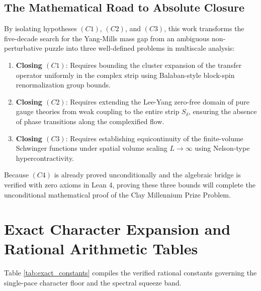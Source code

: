 \documentclass[11pt,reqno]{amsart}
\theoremstyle{plain}
\theoremstyle{definition}
\theoremstyle{remark}
\numberwithin{equation}{section}
\begin{document}
\subsection{The Mathematical Road to Absolute Closure}
By isolating hypotheses $(C1)$, $(C2)$, and $(C3)$, this work transforms the five-decade search for the Yang-Mills mass gap from an ambiguous non-perturbative puzzle into three well-defined problems in multiscale analysis:
\begin{enumerate}
\item \textbf{Closing $(C1)$}: Requires bounding the cluster expansion of the transfer operator uniformly in the complex strip using Balaban-style block-spin renormalization group bounds.
\item \textbf{Closing $(C2)$}: Requires extending the Lee-Yang zero-free domain of pure gauge theories from weak coupling to the entire strip $S_\delta$, ensuring the absence of phase transitions along the complexified flow.
\item \textbf{Closing $(C3)$}: Requires establishing equicontinuity of the finite-volume Schwinger functions under spatial volume scaling $L \to \infty$ using Nelson-type hypercontractivity.
\end{enumerate}
Because $(C4)$ is already proved unconditionally and the algebraic bridge is verified with zero axioms in Lean 4, proving these three bounds will complete the unconditional mathematical proof of the Clay Millennium Prize Problem.

\appendix

\section{Exact Character Expansion and Rational Arithmetic Tables}

Table \ref{tab:exact_constants} compiles the verified rational constants governing the single-pace character floor and the spectral squeeze band.
\end{document}
